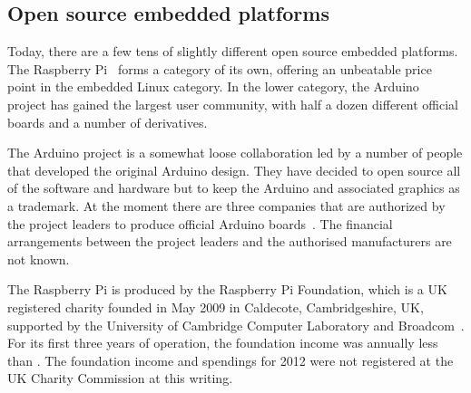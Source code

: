 \documentclass{siamltex}
\begin{document}


\subsection{Open source embedded platforms}
\label{ssec:platforms}

Today, there are a few tens of slightly different open source embedded
platforms.  The Raspberry Pi~\cite{RasPi} forms a category of its own,
offering an unbeatable price point in the embedded Linux category.  In
the lower category, the Arduino~\cite{ArduinoProject,hribernik2011co}
project has gained the largest user community, with half a dozen
different official boards and a number of derivatives.

The Arduino project is a somewhat loose collaboration led by a number of
people that developed the original Arduino design.  They have decided
to open source all of the software and hardware but to keep the
Arduino and associated graphics as a trademark.  At the moment there are
three companies that are authorized by the project leaders to produce
official Arduino boards~\cite{ArduinoPolicy}.  The financial
arrangements between the project leaders and the authorised
manufacturers are not known.

The Raspberry Pi is produced by the Raspberry Pi Foundation, which is
a UK registered charity founded in May 2009 in Caldecote,
Cambridgeshire, UK, supported by the University of Cambridge Computer
Laboratory and Broadcom~\cite{RaspiFoundationWikipedia}.  For its
first three years of operation, the foundation income was annually
less than .  The foundation income and spendings for 2012
were not registered at the UK Charity Commission at this writing.
\end{document}
